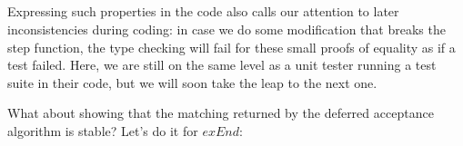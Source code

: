 {\begin{itemize}
\begin{code}
\>[2958I]\AgdaSymbol{(}\AgdaSpace{}%
\AgdaSymbol{(}\AgdaSpace{}%
\AgdaSymbol{(}\AgdaSpace{}%
\AgdaSymbol{(}\<%
\\
\>[.][@{}l@{}]\<[2958I]%
\>[24]\AgdaSymbol{(}\AgdaSpace{}%
\AgdaSymbol{(}\AgdaSpace{}%
\AgdaSymbol{(}\AgdaSpace{}%
\AgdaSymbol{(}\AgdaSpace{}%
\AgdaSymbol{))))))))}\<%
\\
%
\\[\AgdaEmptyExtraSkip]%
\>[0]\AgdaSpace{}%
\AgdaSymbol{:}\AgdaSpace{}%
\AgdaSpace{}%
\AgdaSpace{}%
\<%
\\
\>[0]\AgdaSpace{}%
\AgdaSymbol{=}\AgdaSpace{}%
\<%
\end{code}

Expressing such properties in the code also calls our attention to later inconsistencies during coding: in case we do some modification that breaks the step function, the type checking will fail for these small proofs of equality as if a test failed. Here, we are still on the same level as a unit tester running a test suite in their code, but we will soon take the leap to the next one.

What about showing that the matching returned by the deferred acceptance algorithm is stable? Let's do it for $exEnd$:


\end{itemize}}
